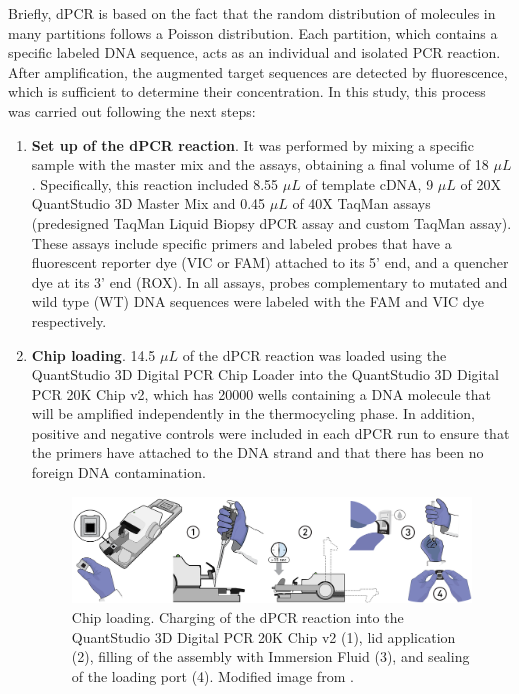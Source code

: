 Briefly, dPCR is based on the fact that the random distribution of molecules in many partitions follows a Poisson distribution. Each partition, which contains a specific labeled DNA sequence, acts as an individual and isolated PCR reaction. After amplification, the augmented target sequences are detected by fluorescence, which is sufficient to determine their concentration. In this study, this process was carried out following the next steps:
\begin{enumerate}[font=\bfseries]
    \item \textbf{Set up of the dPCR reaction}. It was performed by mixing a specific sample with the master mix and the assays, obtaining a final volume of 18 $\mu L$. Specifically, this reaction included 8.55 $\mu L$ of template cDNA, 9 $\mu L$ of 20X QuantStudio\texttrademark{} 3D Master Mix and 0.45 $\mu L$ of 40X TaqMan\texttrademark{} assays (predesigned TaqMan\texttrademark{} Liquid Biopsy dPCR assay and custom TaqMan\texttrademark{} assay). These assays include specific primers and labeled probes that have a fluorescent reporter dye (VIC\texttrademark{} or FAM\texttrademark{}) attached to its 5' end, and a quencher dye at its 3' end (ROX\texttrademark{}). In all assays, probes complementary to mutated and wild type (WT) DNA sequences were labeled with the FAM\texttrademark{} and VIC\texttrademark{} dye respectively.
    \item \textbf{Chip loading}. 14.5 $\mu L$ of the dPCR reaction was loaded using the QuantStudio\texttrademark{} 3D Digital PCR Chip Loader into the QuantStudio\texttrademark{} 3D Digital PCR 20K Chip v2, which has 20000 wells containing a DNA molecule that will be amplified independently in the thermocycling phase. In addition, positive and negative controls were included in each dPCR run to ensure that the primers have attached to the DNA strand and that there has been no foreign DNA contamination.
    \begin{figure}[t]
        \centering
        \includegraphics[width=\textwidth]{Images/chapter_3/chip_loading.png}
        \caption{ Chip loading. Charging of the dPCR reaction into the QuantStudio\texttrademark{} 3D Digital PCR 20K Chip v2 (1), lid application (2), filling of the assembly with Immersion Fluid (3), and sealing of the loading port (4). Modified image from \cite{dPCR_QuantStudio}.}

\end{figure}
\end{enumerate}
